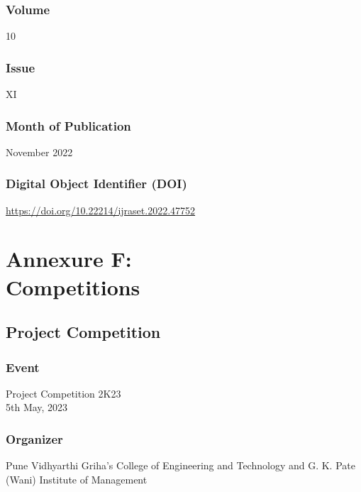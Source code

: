 \documentclass[oneside, 12pt]{book}
\begin{document}
\subsubsection{Volume}
10
\subsubsection{Issue}
XI
\subsubsection{Month of Publication}
November 2022
\subsubsection{Digital Object Identifier (DOI)}
\href{https://doi.org/10.22214/ijraset.2022.47752}{https://doi.org/10.22214/ijraset.2022.47752}

\newpage
\section{Annexure F:\\Competitions}
\newpage
\subsection{Project Competition}
\subsubsection{Event}
Project Competition 2K23\\5th May, 2023
\subsubsection{Organizer}
Pune Vidhyarthi Griha’s College of Engineering and Technology and G. K. Pate (Wani) Institute of Management

\newpage
\end{document}
